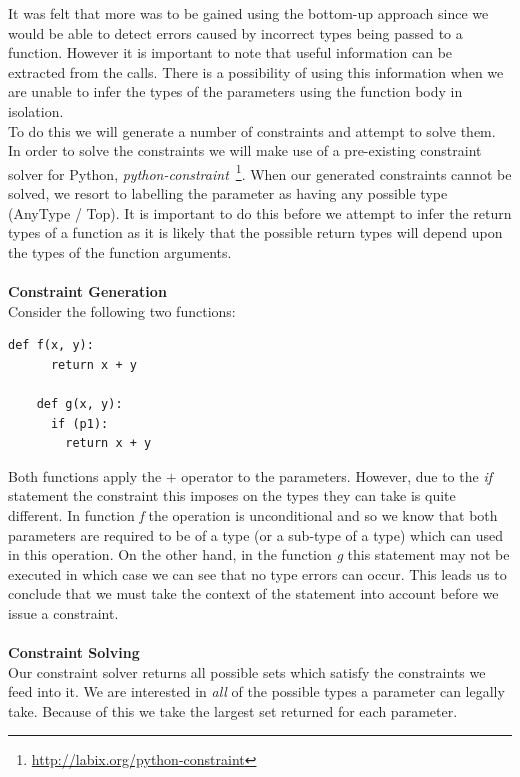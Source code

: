 \documentclass[12pt, titlepage]{article}
\begin{document}
It was felt that more was to be gained using the bottom-up approach since we would be able to detect errors caused by incorrect types being passed to a function. However it is important to note that useful information can be extracted from the calls. There is a possibility of using this information when we are unable to infer the types of the parameters using the function body in isolation. \\
To do this we will generate a number of constraints and attempt to solve them. In order to solve the constraints we will make use of a pre-existing constraint solver for Python, \textit{python-constraint}~\footnote{\url{http://labix.org/python-constraint}}. When our generated constraints cannot be solved, we resort to labelling the parameter as having any possible type (AnyType / Top).
It is important to do this before we attempt to infer the return types of a function as it is likely that the possible return types will depend upon the types of the function arguments. \\\\
\textbf{Constraint Generation} \\
Consider the following two functions:
\begin{lstlisting}[mathescape]
	def f(x, y):
	  return x + y
		
	def g(x, y):
	  if (p1):
	    return x + y
\end{lstlisting}
Both functions apply the $+$ operator to the parameters. However, due to the \textit{if} statement the constraint this imposes on the types they can take is quite different. In function \textit{f} the operation is unconditional and so we know that both parameters are required to be of a type (or a sub-type of a type) which can used in this operation. On the other hand, in the function \textit{g} this statement may not be executed in which case we can see that no type errors can occur. This leads us to conclude that we must take the context of the statement into account before we issue a constraint.
\\\\
\textbf{Constraint Solving} \\
Our constraint solver returns all possible sets which satisfy the constraints we feed into it. We are interested in \textit{all} of the possible types a parameter can legally take. Because of this we take the largest set returned for each parameter.
\end{document}
